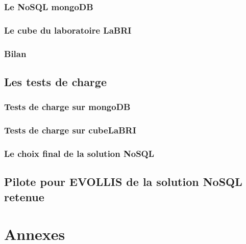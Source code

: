      \section{Le \textsf{NoSQL mongoDB}}\label{mongoDB}
     

     \section{Le \textsf{cube} du laboratoire \textsf{LaBRI}}
     

     \section{Bilan}
     

\chapter{Les tests de charge}

     \section{Tests de charge sur \textsf{mongoDB}}

     \section{Tests de charge sur \textsf{cubeLaBRI}}
     
     \section{Le choix final de la solution \textsf{NoSQL}}

\chapter{Pilote pour \textsf{EVOLLIS} de la solution \textsf{NoSQL} retenue}



\printindex

\nocite{cassandra2}
\nocite{cassandra}
\nocite{NoSQLCmp}
\nocite{NoSQLeurope}
\nocite{NoSQLvsSQL}



\part{Annexes}
\appendix



